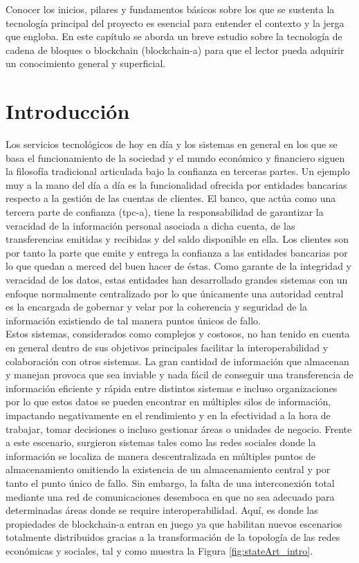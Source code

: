 \documentclass[12pt,a4paper, twoside]{report}
\begin{document}
	Conocer los inicios, pilares y fundamentos básicos sobre los que se sustenta la tecnología principal del proyecto es esencial para entender el contexto y la jerga que engloba. En este capítulo se aborda un breve estudio sobre la tecnología de cadena de bloques o \Gls{blockchain} (\gls{blockchain-a}) para que el lector pueda adquirir un conocimiento general y superficial.


	\section{Introducción}
	
	Los servicios tecnológicos de hoy en día y los sistemas en general en los que se basa el funcionamiento de la sociedad y el mundo económico y financiero siguen la filosofía tradicional articulada bajo la confianza en terceras partes. Un ejemplo muy a la mano del día a día es la funcionalidad ofrecida por entidades bancarias respecto a la gestión de las cuentas de clientes. El banco, que actúa como una tercera parte de confianza (\gls{tpc-a}), tiene la responsabilidad de garantizar la veracidad de la información personal asociada a dicha cuenta, de las transferencias emitidas y recibidas y del saldo disponible en ella. Los clientes son por tanto la parte que emite y entrega la confianza a las entidades bancarias por lo que quedan a merced del buen hacer de éstas. Como garante de la integridad y veracidad de los datos, estas entidades han desarrollado grandes sistemas con un enfoque normalmente centralizado por lo que únicamente una autoridad central es la encargada de gobernar y velar por la coherencia y seguridad de la información existiendo de tal manera puntos únicos de fallo. \\
	
	Estos sistemas, considerados como complejos y costosos, no han tenido en cuenta en general dentro de sus objetivos principales facilitar la interoperabilidad y colaboración con otros sistemas. La gran cantidad de información que almacenan y manejan provoca que sea inviable y nada fácil de conseguir una transferencia de información eficiente y rápida entre distintos sistemas e incluso organizaciones por lo que estos datos se pueden encontrar en múltiples silos de información, impactando negativamente en el rendimiento y en la efectividad a la hora de trabajar, tomar decisiones o incluso gestionar áreas o unidades de negocio. Frente a este escenario, surgieron sistemas tales como las redes sociales donde la información se localiza de manera descentralizada en múltiples puntos de almacenamiento omitiendo la existencia de un almacenamiento central y por tanto el punto único de fallo. Sin embargo, la falta de una interconexión total mediante una red de comunicaciones desemboca en que no sea adecuado para determinadas áreas donde se require interoperabilidad. Aquí, es donde las propiedades de \gls{blockchain-a} entran en juego ya que habilitan nuevos escenarios totalmente distribuidos gracias a la transformación de la topología de las redes económicas y sociales, tal y como muestra la Figura \ref{fig:stateArt_intro}. \\
\end{document}
